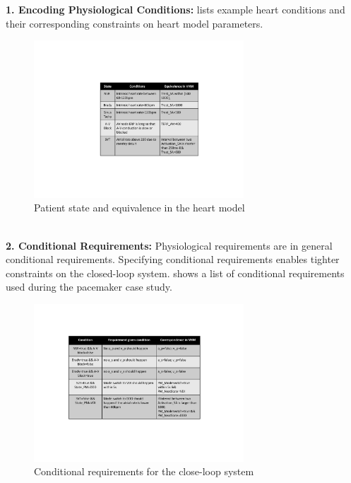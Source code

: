 \noindent
\textbf{1. Encoding Physiological Conditions:}   lists example heart conditions and their corresponding constraints on heart model parameters.
\begin{figure}[!t]
	\center
	\includegraphics[width=0.70\textwidth]{figs/state.pdf}
	\center
	
	\caption{Patient state and equivalence in the heart model}
	\label{fig:state}
\end{figure}
\noindent
\\\textbf{2. Conditional Requirements:} Physiological requirements are in general conditional requirements. Specifying conditional requirements enables tighter constraints on the closed-loop system.  shows a list of conditional requirements used during the pacemaker case study. 
\begin{figure}
	\center
	\includegraphics[width=0.7\textwidth]{figs/conditional.pdf}
	\center
	\vspace{-10pt}
	\caption{Conditional requirements for the close-loop system}
	\label{fig:conditional}
\end{figure}
